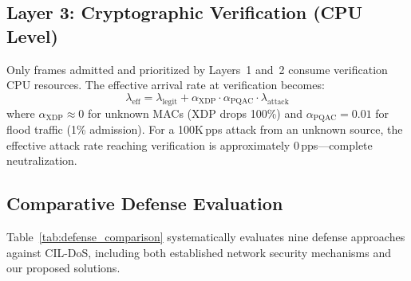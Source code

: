 \documentclass[journal]{IEEEtran}
\begin{document}
\subsection{Layer 3: Cryptographic Verification (CPU Level)}
Only frames admitted and prioritized by Layers~1 and~2 consume verification CPU resources. The effective arrival rate at verification becomes:
\begin{equation}
\lambda_{\text{eff}} = \lambda_{\text{legit}} + \alpha_{\text{XDP}} \cdot \alpha_{\text{PQAC}} \cdot \lambda_{\text{attack}}
\end{equation}
where $\alpha_{\text{XDP}} \approx 0$ for unknown MACs (XDP drops 100\%) and $\alpha_{\text{PQAC}} = 0.01$ for flood traffic (1\% admission). For a 100K\,pps attack from an unknown source, the effective attack rate reaching verification is approximately 0\,pps---complete neutralization.

\subsection{Comparative Defense Evaluation}
Table~\ref{tab:defense_comparison} systematically evaluates nine defense approaches against CIL-DoS, including both established network security mechanisms and our proposed solutions.
\end{document}
